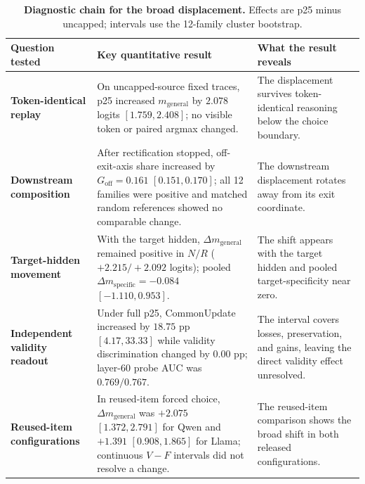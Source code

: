 \documentclass[letterpaper]{article} %
\begin{document}
\begin{table}[t]
\centering
\small
\setlength{\tabcolsep}{4pt}
\renewcommand{\arraystretch}{1.12}
\begin{tabular}{@{}L{0.20\textwidth}L{0.38\textwidth}L{0.34\textwidth}@{}}
\toprule
Question tested & Key quantitative result & What the result reveals \\
\midrule

\textbf{Token-identical}\newline
\textbf{replay}
&
On uncapped-source fixed traces, p25 increased
$m_{\mathrm{general}}$ by $2.078$ logits $[1.759,2.408]$; no visible token or
paired argmax changed.
&
The displacement survives token-identical reasoning below the choice boundary.
\\

\addlinespace

\textbf{Downstream}\newline
\textbf{composition}
&
After rectification stopped, off-exit-axis share increased by
$G_{\mathrm{off}}=0.161$ $[0.151,0.170]$; all 12 families were positive and
matched random references showed no comparable change.
&
The downstream displacement rotates away from its exit coordinate.
\\

\addlinespace

\textbf{Target-hidden}\newline
\textbf{movement}
&
With the target hidden, $\Delta m_{\mathrm{general}}$ remained positive in
$N/R$ ($+2.215/+2.092$ logits); pooled
$\Delta m_{\mathrm{specific}}=-0.084$ $[-1.110,0.953]$.
&
The shift appears with the target hidden and pooled target-specificity near zero.
\\

\addlinespace

\textbf{Independent validity}\newline
\textbf{readout}
&
Under full p25, CommonUpdate increased by $18.75$ pp
$[4.17,33.33]$ while validity discrimination changed by $0.00$ pp;
layer-60 probe AUC was $0.769/0.767$.
&
The interval covers losses, preservation, and gains, leaving the direct validity effect unresolved.
\\

\addlinespace

\textbf{Reused-item}\newline
\textbf{configurations}
&
In reused-item forced choice, $\Delta m_{\mathrm{general}}$ was
$+2.075$ $[1.372,2.791]$ for Qwen and $+1.391$ $[0.908,1.865]$ for Llama;
continuous $V-F$ intervals did not resolve a change.
&
The reused-item comparison shows the broad shift in both released configurations.
\\

\bottomrule
\end{tabular}
\caption{\textbf{Diagnostic chain for the broad displacement.} Effects are p25 minus uncapped; intervals use the 12-family cluster bootstrap.}
\label{tab:diagnostic-chain}
\end{table}
\end{document}
